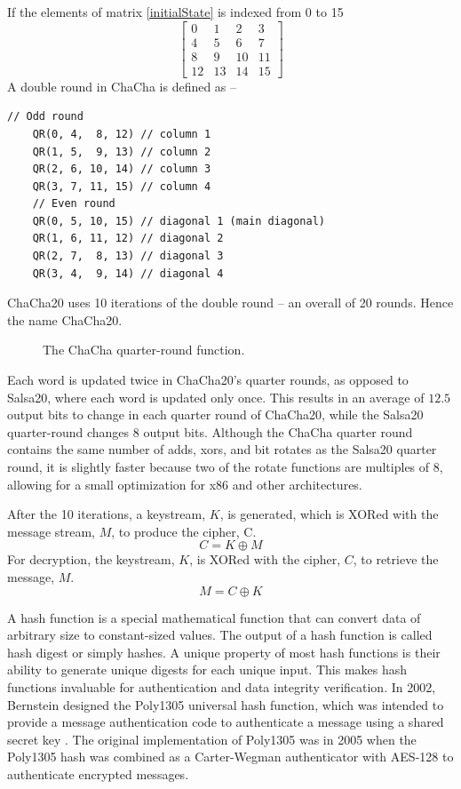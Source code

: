 \documentclass[a4paper]{cas-sc}
\begin{document}
\noindent If the elements of matrix \ref{initialState} is indexed from 0 to 15
\[\left[
        \begin{array}{cccc}
            0  & 1  & 2  & 3  \\
            4  & 5  & 6  & 7  \\
            8  & 9  & 10 & 11 \\
            12 & 13 & 14 & 15
        \end{array}
        \right]\]
A double round in ChaCha is defined as --
\begin{lstlisting}[basicstyle=\ttfamily,frame=none]
    // Odd round
    QR(0, 4,  8, 12) // column 1
    QR(1, 5,  9, 13) // column 2
    QR(2, 6, 10, 14) // column 3
    QR(3, 7, 11, 15) // column 4
    // Even round
    QR(0, 5, 10, 15) // diagonal 1 (main diagonal)
    QR(1, 6, 11, 12) // diagonal 2
    QR(2, 7,  8, 13) // diagonal 3
    QR(3, 4,  9, 14) // diagonal 4
\end{lstlisting}
ChaCha20 uses 10 iterations of the double round -- an overall of 20 rounds. Hence the name ChaCha20.

\begin{figure}[pos=h]
    \centering
    
    \caption{The ChaCha quarter-round function.}
\end{figure}

Each word is updated twice in ChaCha20's quarter rounds, as opposed to Salsa20, where each word is updated only once. This results in an average of $12.5$ output bits to change in each quarter round of ChaCha20, while the Salsa20 quarter-round changes 8 output bits. Although the ChaCha quarter round contains the same number of adds, xors, and bit rotates as the Salsa20 quarter round, it is slightly faster because two of the rotate functions are multiples of 8, allowing for a small optimization for x86 and other architectures.

After the 10 iterations, a keystream, $K$, is generated, which is XORed with the message stream, $M$, to produce the cipher, C.
\[C = K \oplus M\]
For decryption, the keystream, $K$, is XORed with the cipher, $C$, to retrieve the message, $M$.
\[M = C \oplus K\]


A hash function is a special mathematical function that can convert data of arbitrary size to constant-sized values. The output of a hash function is called hash digest or simply hashes. A unique property of most hash functions is their ability to generate unique digests for each unique input. This makes hash functions invaluable for authentication and data integrity verification. In 2002, Bernstein designed the Poly1305 universal hash function, which was intended to provide a message authentication code to authenticate a message using a shared secret key \cite{bernstein2005protecting}. The original implementation of Poly1305 was in 2005 when the Poly1305 hash was combined as a Carter-Wegman authenticator \cite{carter1981new} with AES-128 to authenticate encrypted messages.
\end{document}
